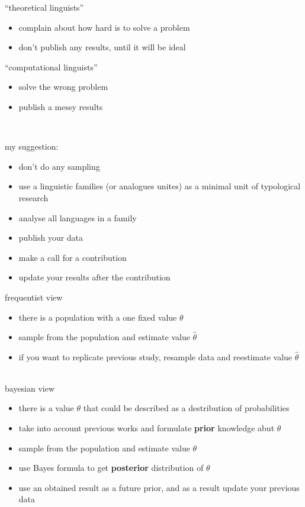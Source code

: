\documentclass[13pt, t]{beamer}
\begin{document}
\begin{frame}
\begin{multicols}{2}
``theoretical linguists''
\begin{itemize}
\item complain about how hard is to solve a problem
\item don't publish any results, until it will be ideal
\end{itemize}
\columnbreak
``computational linguists''
\begin{itemize}
\item solve the wrong problem
\item publish a messy results
\end{itemize}
\vfill
\ \pause
\end{multicols}
my suggestion: 
\begin{itemize}
\item don't do any sampling
\item use a linguistic families (or analogues unites) as a minimal unit of typological research
\item analyse all languages in a family
\item publish your data
\item make a call for a contribution
\item update your results after the contribution
\end{itemize}
\end{frame}

\begin{frame}
\begin{multicols}{2}
frequentist view
\begin{itemize}
\item there is a population with a one fixed value $\theta$
\item sample from the population and estimate value $\hat{\theta}$
\item if you want to replicate previous study, resample data and reestimate value $\hat{\theta}$
\vfill
\
\end{itemize}
\columnbreak
bayesian view
\begin{itemize}
\item there is a value $\theta$ that could be described as a destribution of probabilities
\item take into account previous works and formulate \textbf{prior} knowledge abut $\theta$
\item sample from the population and estimate value $\theta$
\item use Bayes formula to get \textbf{posterior} distribution of $\theta$
\item use an obtained result as a future prior, and as a result update your previous data
\end{itemize}
\end{multicols}
\end{frame}
\end{document}
